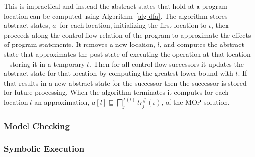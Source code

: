 This is impractical and instead the abstract states that hold at a
program location can be computed using Algorithm~\ref{alg-dfa}.
The algorithm stores abstract states, $a$, for each location, initializing
the first location to $\iota$, then proceeds along the control
flow relation of the program to approximate the effects of program
statements.  It removes a new location, $l$, and computes the abstract
state that approximates the post-state of executing the operation
at that location -- storing it in a temporary $t$.  Then for
all control flow successors it updates the abstract state for
that location by computing the greatest lower bound with $t$.
If that results in a new abstract state for the successor then
the successor is stored for future processing.  When the algorithm
terminates it computes for each location $l$ an approximation,
$a[l] \sqsubseteq \displaystyle\bigsqcap_j^{T(l)} tr_j^\#(\iota)$, of the MOP solution.

\subsubsection{Model Checking}

\subsubsection{Symbolic Execution}

